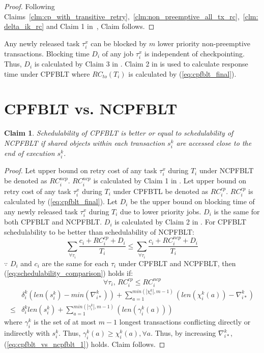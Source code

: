 \documentclass[conference]{IEEEtran}
\newtheorem{clm}{Claim}
\begin{document}
%
\begin{proof}
%
Following Claims~\ref{clm:cp_with_transitive_retry},~\ref{clm:non_preemptive_all_tx_rc},~\ref{clm:delta_ik_rc}  and Claim 1 in~\cite{fblt}, Claim follows.
%
\end{proof}
%
Any newly released task $\tau_{i}^{x}$ can be blocked by $m$ lower priority non-preemptive transactions. Blocking time $D_{i}$ of any job $\tau_i^x$ is independent of checkpointing. Thus, $D_i$ is calculated by Claim 3 in \cite{fblt}. Claim 2 in \cite{fblt} is used to calculate response time under CPFBLT where $RC_{to}(T_{i})$ is calculated by (\ref{eq:cpfblt_final}).
%
\section{CPFBLT vs. NCPFBLT}\label{sec:schedulabiltiy comparison}

\begin{clm}\label{clm:cp_ncp_fblt_schedulabiltiy_comp}
%
Schedulability of CPFBLT is better or equal to schedulability of NCPFBLT if shared objects within each transaction $s_i^k$ are accessed close to the end of execution $s_i^k$.
%
\end{clm}
%
\begin{proof}
%
Let upper bound on retry cost of any task $\tau_{i}^{x}$ during $T_{i}$ under NCPFBLT be denoted as $RC_{i}^{ncp}$. $RC_{i}^{ncp}$ is calculated by Claim 1 in \cite{fblt}. Let upper bound on retry cost of any task $\tau_{i}^{x}$ during $T_{i}$ under CPFBTL be denoted as $RC_{i}^{cp}$. $RC_{i}^{cp}$ is calculated by (\ref{eq:cpfblt_final}). Let $D_{i}$ be the upper bound on blocking time of any newly released task $\tau_{i}^{x}$ during $T_{i}$ due to lower priority jobs. $D_{i}$ is the same for both CPFBLT and NCPFBLT. $D_{i}$ is calculated by Claim 2 in \cite{fblt}. For CPFBLT schedulability to be better than schedulability of NCPFBLT: 
%
\begin{equation}
\sum_{\forall\tau_{i}}\frac{c_{i}+RC_{i}^{cp}+D_{i}}{T_{i}}\le\sum_{\forall\tau_{i}}\frac{c_{i}+RC_{i}^{ncp}+D_{i}}{T_{i}}\label{eq:schedulability_comparison}
\end{equation}
$\because$ $D_{i}$ and $c_{i}$ are the same for each $\tau_{i}$
under CPFBLT and NCPFBLT, then (\ref{eq:schedulability_comparison})
holds if:
\[
\forall\tau_{i},\, RC_{i}^{cp}\le RC_{i}^{ncp}
\]
%
\begin{eqnarray}
 & \delta_{i}^{k}\left(len\left(s_{i}^{k}\right)-min\left(\nabla_{i*}^{k}\right)\right)+\sum_{a=1}^{min\left(|\chi_{i}^{k}|,m-1\right)}\left(len\left(\chi_{i}^{k}(a)\right)-\nabla_{i*}^{k}\right)\nonumber\\
\le & \delta_{i}^{k}len\left(s_{i}^{k}\right)+\sum_{a=1}^{min\left(|\gamma_{i}^{k}|,m-1\right)}\left(len\left(\gamma_{i}^{k}(a)\right)\right)
\label{eq:cpfblt_vs_ncpfblt_1}
\end{eqnarray}
%
where $\gamma_i^k$ is the set of at most $m-1$ longest transactions conflicting directly or indirectly with $s_i^k$. Thus, $\gamma_i^k(a) \ge \chi_i^k(a), \forall a$. Thus, by increasing $\nabla_{i*}^k$, (\ref{eq:cpfblt_vs_ncpfblt_1}) holds. Claim follows.
%
\end{proof}
%
\end{document}
